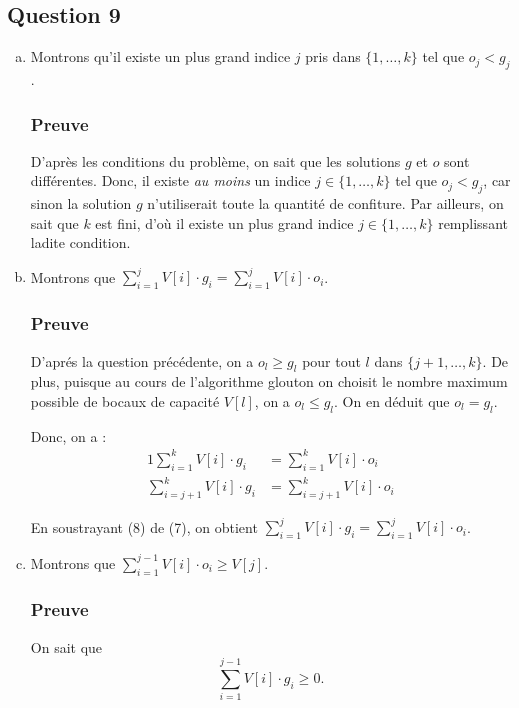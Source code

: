 \documentclass[12pt,a4paper]{article}
\begin{document}
\subsection*{Question 9}
\begin{enumerate}[a)]
 \item Montrons qu'il existe un plus grand indice $j$ pris dans $\{1,\dotsc,k\}$ tel que $o_j < g_j$.
 
 \subsubsection*{Preuve}
 D'apr\`es les conditions du probl\`eme, on sait que les solutions $g$ et $o$ sont diff\'erentes. Donc, il existe {\itshape au moins} un indice $j \in \{1,\dotsc,k\}$ tel que $o_j < g_j$, car sinon la solution $g$ n'utiliserait toute la quantit\'e de confiture. Par ailleurs, on sait que $k$ est fini, d'o\`u il existe un plus grand indice $j \in \{1,\dotsc,k\}$ remplissant ladite condition.
 
 \item Montrons que \( \displaystyle\sum_{i=1}^{j} V[i]\cdot g_i = \displaystyle\sum_{i=1}^{j} V[i]\cdot o_i\).
 
 \subsubsection*{Preuve}
 D'apr\'es la question pr\'ec\'edente, on a $o_l \geq g_l$ pour tout $l$ dans $\{j+1,\dotsc, k\}$. De plus, puisque au cours de l'algorithme glouton on choisit le nombre maximum possible de bocaux de capacit\'e $V[l]$, on a $o_l \leq g_l$. On en d\'eduit que $o_l = g_l$.
 
 Donc, on a :
 \begin{alignat}{1}
    \displaystyle\sum_{i=1}^{k} V[i]\cdot g_i &= \displaystyle\sum_{i=1}^{k} V[i]\cdot o_i \\
    \displaystyle\sum_{i=j+1}^{k} V[i]\cdot g_i &= \displaystyle\sum_{i=j+1}^{k} V[i]\cdot o_i
 \end{alignat}
 
 En soustrayant (8) de (7), on obtient \( \displaystyle\sum_{i=1}^{j} V[i]\cdot g_i = \displaystyle\sum_{i=1}^{j} V[i]\cdot o_i\).
 
 \item Montrons que \( \displaystyle\sum_{i=1}^{j-1} V[i]\cdot o_i \geq V[j]\).
 
 \subsubsection*{Preuve}
 On sait que 
 \begin{equation*}
    \displaystyle\sum_{i=1}^{j-1} V[i]\cdot g_i \geq 0.
 \end{equation*}


\end{enumerate}
\end{document}
